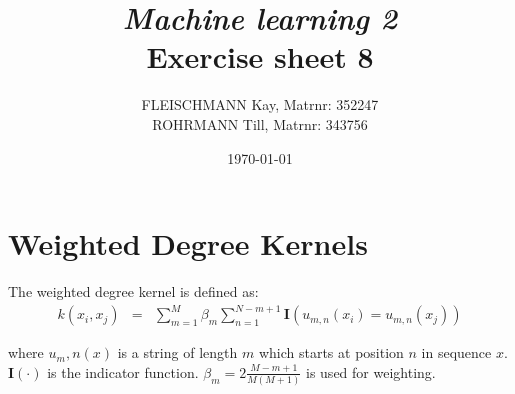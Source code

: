 \documentclass[a4paper, 12pt, titlepage]{article}
\title
{{\em Machine learning 2}\\
Exercise sheet 8}
\author{FLEISCHMANN Kay, Matrnr: 352247\\
	ROHRMANN Till, Matrnr: 343756}
\date{\today}
\begin{document}
\maketitle

\section{Weighted Degree Kernels}

The weighted degree kernel is defined as:
\begin{eqnarray}
	k(x_i,x_j) &=& \sum_{m=1}^M \beta_m \sum_{n=1}^{N-m+1} \boldsymbol{I}\left(u_{m,n}(x_i)=u_{m,n}(x_j)\right)
\end{eqnarray}

where $u_m,n(x)$ is a string of length $m$ which starts at position $n$ in sequence $x$. 
$\boldsymbol{I}(\cdot)$ is the indicator function.
$\beta_m=2\frac{M-m+1}{M(M+1)}$ is used for weighting.
\end{document}
